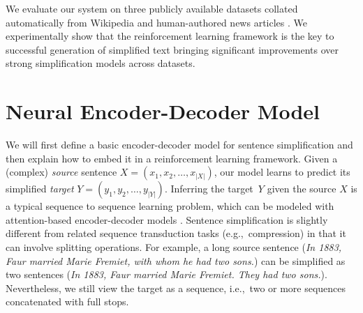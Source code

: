 \documentclass[11pt,letterpaper]{article}
\begin{document}
We evaluate our system on three publicly available datasets collated
automatically from Wikipedia
\cite{zhu2010monolingual,woodsend-lapata:2011:EMNLP} and
human-authored news articles \cite{Xu-EtAl:2015:TACL}. We
experimentally show that the reinforcement learning framework is the key
to successful generation of simplified text bringing significant
improvements over strong simplification models across datasets. 






\section{Neural Encoder-Decoder Model}
\label{sec:encdeca}

We will first define a basic encoder-decoder model for sentence
simplification and then explain how to embed it in a reinforcement
learning framework. Given a (complex) \emph{source} sentence
\mbox{$X = (x_1, x_2, \dots, x_{|X|})$}, our model learns to predict
its simplified \emph{target} $Y = (y_1, y_2, \dots,
y_{|Y|})$.
Inferring the target~$Y$ given the source $X$ is a typical sequence to
sequence learning problem, which can be modeled with attention-based
encoder-decoder models
\cite{bahdanau2014neural,luong-etal:2015:EMNLP}. Sentence
simplification is slightly different from related sequence
transduction tasks (e.g.,~compression) in that it can involve
splitting operations. For example, a long source sentence (\textsl{In
	1883, Faur married Marie Fremiet, with whom he had two sons.}) can
be simplified as two sentences (\textsl{In 1883, Faur married Marie
	Fremiet. They had two sons.}).  Nevertheless, we still view the
target as a sequence, i.e.,~two or more sequences concatenated with
full stops.
\end{document}
